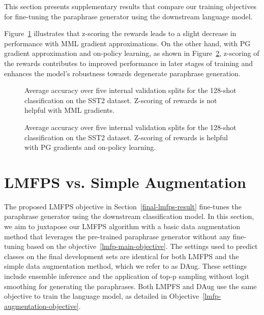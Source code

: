 \documentclass[11pt]{article}
\begin{document}
This section presents supplementary results that compare our training objectives for fine-tuning the paraphrase generator using the downstream language model.

Figure~\ref{zscore_mml} illustrates that z-scoring the rewards leads to a slight decrease in performance with MML gradient approximations. On the other hand, with PG gradient approximation and on-policy learning, as shown in Figure~\ref{zscore_pg}, z-scoring of the rewards contributes to improved performance in later stages of training and enhances the model's robustness towards degenerate paraphrase generation.

\begin{figure}[h]
\begin{center}

\end{center}
\caption{Average accuracy over five internal validation splits for the 128-shot classification on the SST2 dataset. Z-scoring of rewards is not helpful with MML gradients.}
\label{zscore_mml}
\end{figure}


\begin{figure}[h]
\begin{center}

\end{center}
\caption{Average accuracy over five internal validation splits for the 128-shot classification on the SST2 dataset. Z-scoring of rewards is helpful with PG gradients and on-policy learning.}
\label{zscore_pg}
\end{figure}

\section{LMFPS vs. Simple Augmentation}
\label{lmfps-simple-augmentation:appendix}
The proposed LMFPS objective in Section~\ref{final-lmfps-result} fine-tunes the paraphrase generator using the downstream classification model. In this section, we aim to juxtapose our LMFPS algorithm with a basic data augmentation method that leverages the pre-trained paraphrase generator without any fine-tuning based on the objective~\ref{lmfp-main-objective}. The settings used to predict classes on the final development sets are identical for both LMFPS and the simple data augmentation method, which we refer to as DAug. These settings include ensemble inference and the application of top-p sampling without logit smoothing for generating the paraphrases. Both LMPFS and DAug use the same objective to train the language model, as detailed in Objective~\ref{lmfp-augmentation-objective}.
\end{document}
